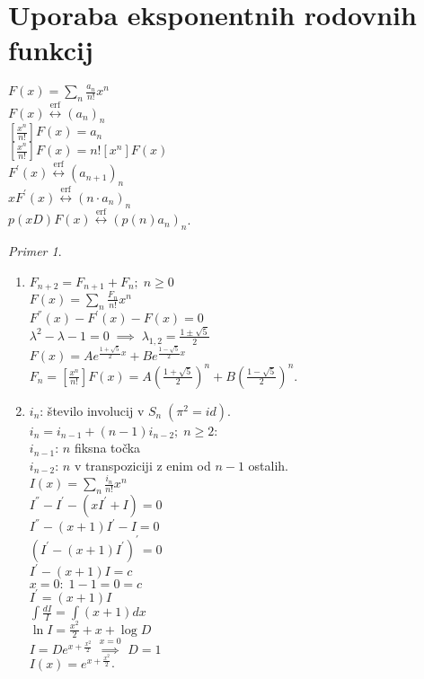 \documentclass[a4paper, 12pt]{book}
\theoremstyle{definition}
\theoremstyle{remark}
\newtheorem*{ex}{Primer}
\begin{document}
\section{Uporaba eksponentnih rodovnih funkcij}

$F(x) = \sum_n \frac{a_n}{n!} x^n$ \\
$F(x) \stackrel{\text{erf}}{\longleftrightarrow} (a_n)_n$ \\
$\left[\frac{x^n}{n!}\right] F(x) = a_n$ \\
$\left[\frac{x^n}{n!}\right] F(x) = n! [x^n] F(x)$ \\
$F^{'}(x) \stackrel{\text{erf}}{\longleftrightarrow} (a_{n+1})_n$ \\
$x F^{'}(x) \stackrel{\text{erf}}{\longleftrightarrow} (n \cdot a_n)_n$ \\
$p(xD) F(x) \stackrel{\text{erf}}{\longleftrightarrow} (p(n) a_n)_n$.
\begin{ex} \text{} \\
  \begin{enumerate}[label=(\arabic{*})]
    \item $F_{n+2} = F_{n+1} + F_n; \; n \geq 0$ \\
      $F(x) = \sum_n \frac{F_n}{n!} x^n$ \\
      $F^{''}(x) - F^{'}(x) - F(x) = 0$ \\
      $\lambda^2 - \lambda - 1 = 0 \; \implies \; \lambda_{1,2} = \frac{1 \pm \sqrt{5}}{2}$ \\
      $F(x) = A e^{\frac{1+\sqrt{5}}{2} x} + B e^{\frac{1-\sqrt{5}}{2} x}$ \\
      $F_n = \left[\frac{x^n}{n!}\right] F(x) =
        A \left(\frac{1+\sqrt{5}}{2}\right)^n + B \left(\frac{1-\sqrt{5}}{2}\right)^n$.
    \item $i_n$: število involucij v $S_n \; (\pi^2 = id)$. \\
      $i_n = i_{n-1} + (n-1) i_{n-2}; \; n \geq 2$: \\
      $i_{n-1}$: $n$ fiksna točka \\
      $i_{n-2}$: $n$ v transpoziciji z enim od $n-1$ ostalih. \\
      $I(x) = \sum_{n} \frac{i_n}{n!} x^n$ \\
      $I^{''} - I^{'} - (xI^{'} + I) = 0$ \\
      $I^{''} - (x+1)I^{'} - I = 0$ \\
      $(I^{'} - (x+1)I^{'})^{'} = 0$ \\
      $I^{'} - (x+1)I = c$ \\
      $x=0:\; 1 - 1 = 0 = c$ \\
      $I^{'} = (x+1)I$ \\
      $\int \frac{dI}{I} = \int (x+1) dx$ \\
      $\ln I = \frac{x^2}{2} + x + \log D$ \\
      $I = D e^{x + \frac{x^2}{2}} \; \stackrel{x=0}{\implies} \; D = 1$\\
      $I(x) = e^{x + \frac{x^2}{2}}$.
  \end{enumerate}
\end{ex}
\end{document}

